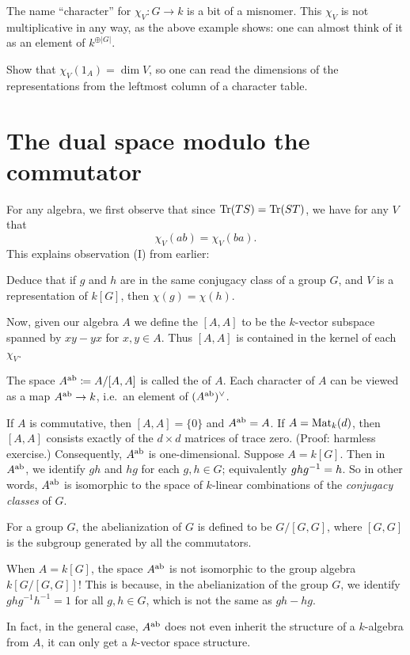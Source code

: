 \begin{abuse}
	The name ``character'' for $\chi_V \colon G \to k$ is a bit of a misnomer.
	This $\chi_V$ is not multiplicative in any way,
	as the above example shows: one can almost think of it as
	an element of $k^{\oplus |G|}$.
\end{abuse}

\begin{ques}
	Show that $\chi_V(1_A) = \dim V$,
	so one can read the dimensions of the representations
	from the leftmost column of a character table.
\end{ques}

\section{The dual space modulo the commutator}
For any algebra, we first observe that since $\operatorname{Tr}(TS) = \operatorname{Tr}(ST)$,
we have for any $V$ that
\[ \chi_V(ab) = \chi_V(ba). \]
This explains observation (I) from earlier:
\begin{ques}
	Deduce that if $g$ and $h$ are in the same conjugacy class of a
	group $G$, and $V$ is a representation of $k[G]$,
	then $\chi(g) = \chi(h)$.
\end{ques}
Now, given our algebra $A$ we define the  $[A,A]$
to be the $k$-vector subspace spanned by $xy-yx$ for $x,y \in A$.
Thus $[A,A]$ is contained in the kernel of each $\chi_V$.
\begin{definition}
	The space $A^\text{ab} \coloneqq A / [A,A]$ is called the  of $A$.
	Each character of $A$ can be viewed as a map $A^\text{ab} \to k$, i.e.\ an element of $(A^\text{ab})^\vee$.
\end{definition}
\begin{example}
	\listhack
	\begin{enumerate}[(a)]
		\ii If $A$ is commutative, then $[A,A] = \{0\}$
		and $A^\text{ab} = A$.
		\ii If $A = \mathrm{Mat}_k(d)$, then $[A,A]$ consists exactly
		of the $d \times d$ matrices of trace zero.
		(Proof: harmless exercise.)
		Consequently, $A^\text{ab}$ is one-dimensional.
		\ii Suppose $A = k[G]$.
		Then in $A^\text{ab}$, we identify $gh$ and $hg$ for each $g,h \in G$;
		equivalently $ghg^{-1} = h$.
		So in other words, $A^\text{ab}$ is isomorphic to the space of
		$k$-linear combinations of the \emph{conjugacy classes} of $G$.
	\end{enumerate}
\end{example}
\begin{remark}
	[Warning] For a group $G$, the abelianization of $G$ is defined to be
	$G/[G, G]$, where $[G, G]$ is the subgroup generated by all the commutators.

	When $A=k[G]$, the space $A^\text{ab}$ is not isomorphic to the group algebra
	$k[G/[G, G]]$! This is because, in the abelianization of the group $G$,
	we identify $ghg^{-1} h^{-1}=1$ for all $g, h \in G$, which is not the same
	as $gh-hg$.

	In fact, in the general case, $A^\text{ab}$ does not even inherit the structure of a
	$k$-algebra from $A$, it can only get a $k$-vector space structure.
\end{remark}


